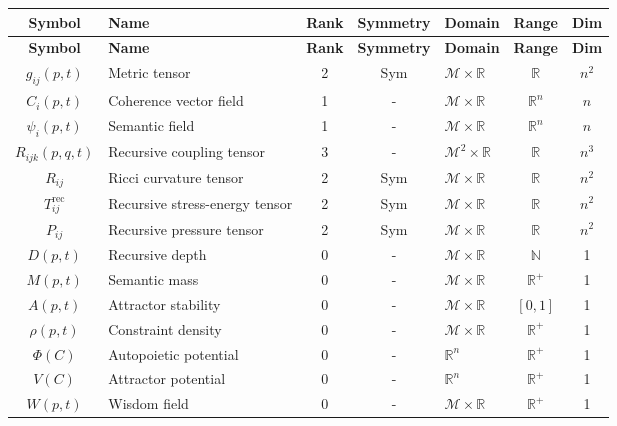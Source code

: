 {\small
\renewcommand{\arraystretch}{1.1}
\begin{longtable}{|c|p{5.5cm}|c|c|p{1.5cm}|c|c|}
\hline
\textbf{Symbol} & \textbf{Name} & \textbf{Rank} & \textbf{Symmetry} & \textbf{Domain} & \textbf{Range} & \textbf{Dim} \\
\hline
\endfirsthead
\hline
\textbf{Symbol} & \textbf{Name} & \textbf{Rank} & \textbf{Symmetry} & \textbf{Domain} & \textbf{Range} & \textbf{Dim} \\
\hline
\endhead
\(g_{ij}(p,t)\) & Metric tensor & 2 & Sym & \(\mathcal{M} \times \mathbb{R}\) & \(\mathbb{R}\) & \(n^2\) \\
\hline
\(C_i(p,t)\) & Coherence vector field & 1 & - & \(\mathcal{M} \times \mathbb{R}\) & \(\mathbb{R}^n\) & \(n\) \\
\hline
\(\psi_i(p,t)\) & Semantic field & 1 & - & \(\mathcal{M} \times \mathbb{R}\) & \(\mathbb{R}^n\) & \(n\) \\
\hline
\(R_{ijk}(p,q,t)\) & Recursive coupling tensor & 3 & - & \(\mathcal{M}^2 \times \mathbb{R}\) & \(\mathbb{R}\) & \(n^3\) \\
\hline
\(R_{ij}\) & Ricci curvature tensor & 2 & Sym & \(\mathcal{M} \times \mathbb{R}\) & \(\mathbb{R}\) & \(n^2\) \\
\hline
\(T_{ij}^{\text{rec}}\) & Recursive stress-energy tensor & 2 & Sym & \(\mathcal{M} \times \mathbb{R}\) & \(\mathbb{R}\) & \(n^2\) \\
\hline
\(P_{ij}\) & Recursive pressure tensor & 2 & Sym & \(\mathcal{M} \times \mathbb{R}\) & \(\mathbb{R}\) & \(n^2\) \\
\hline
\(D(p,t)\) & Recursive depth & 0 & - & \(\mathcal{M} \times \mathbb{R}\) & \(\mathbb{N}\) & 1 \\
\hline
\(M(p,t)\) & Semantic mass & 0 & - & \(\mathcal{M} \times \mathbb{R}\) & \(\mathbb{R}^+\) & 1 \\
\hline
\(A(p,t)\) & Attractor stability\footnotemark[1] & 0 & - & \(\mathcal{M} \times \mathbb{R}\) & \([0,1]\) & 1 \\
\hline
\(\rho(p,t)\) & Constraint density & 0 & - & \(\mathcal{M} \times \mathbb{R}\) & \(\mathbb{R}^+\) & 1 \\
\hline
\(\Phi(C)\) & Autopoietic potential & 0 & - & \(\mathbb{R}^n\) & \(\mathbb{R}^+\) & 1 \\
\hline
\(V(C)\) & Attractor potential\footnotemark[1] & 0 & - & \(\mathbb{R}^n\) & \(\mathbb{R}^+\) & 1 \\
\hline
\(W(p,t)\) & Wisdom field & 0 & - & \(\mathcal{M} \times \mathbb{R}\) & \(\mathbb{R}^+\) & 1 \\

\end{longtable}}
